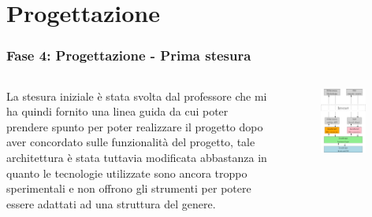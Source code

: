 \documentclass{beamer}
\begin{document}
\section{Progettazione}
\begin{frame}
	\frametitle{Fase 4: Progettazione - Prima stesura}
	\begin{columns}
			La stesura iniziale è stata svolta dal professore che mi ha quindi fornito una linea guida da cui poter prendere spunto per poter realizzare il progetto dopo aver concordato sulle funzionalità del progetto, tale architettura è stata tuttavia modificata abbastanza in quanto le tecnologie utilizzate sono ancora troppo sperimentali e non offrono gli strumenti per potere essere adattati ad una struttura del genere.
		\begin{figure}
			\includegraphics[width=0.88\textwidth]{figures/architecture1.png}
		\end{figure}
	\end{columns}
\end{frame}
\end{document}
